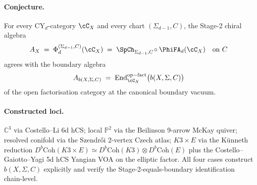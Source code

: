 \paragraph{Conjecture.} For every CY$_d$-category
$\cC_X$ and every chart $(\Sigma_{d-1}, C)$, the Stage-2 chiral algebra
\[
A_X \;=\; \Phi^{(\Sigma_{d-1}, C)}_d(\cC_X)
\;=\; \SpCh_{\Sigma_{d-1}, C} \!\circ \PhiFA_d(\cC_X)
\quad\text{on } C
\]
agrees with the boundary algebra
\[
A_{b(X, \Sigma, C)} \;=\; \mathrm{End}^{\mathrm{op-fact}}_{\cC_X}\bigl(b(X, \Sigma, C)\bigr)
\]
of the open factorisation category at the canonical boundary vacuum.

\paragraph{Constructed loci.} $\mathbb{C}^3$ via Costello--Li 6d hCS;
local $\mathbb{P}^2$ via the Beilinson 9-arrow McKay quiver;
resolved conifold via the Szendr\H{o}i 2-vertex Czech atlas;
$K3 \times E$ via the K\"unneth reduction
$D^b\mathrm{Coh}(K3 \times E) \simeq D^b\mathrm{Coh}(K3) \otimes D^b\mathrm{Coh}(E)$
plus the Costello--Gaiotto--Yagi 5d hCS Yangian VOA on the elliptic
factor. All four cases construct $b(X, \Sigma, C)$ explicitly and
verify the Stage-2-equals-boundary identification chain-level.

